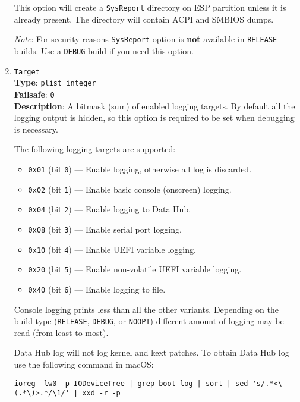 \documentclass[]{article}
\providecommand{\tightlist}{%
  \setlength{\itemsep}{0pt}\setlength{\parskip}{0pt}}
\begin{document}
\begin{enumerate}
  This option will create a \texttt{SysReport} directory on ESP partition
  unless it is already present. The directory will contain ACPI and SMBIOS dumps.

  \emph{Note}: For security reasons \texttt{SysReport} option is \textbf{not} available
  in \texttt{RELEASE} builds. Use a \texttt{DEBUG} build if you need this option.

\item
  \texttt{Target}\\
  \textbf{Type}: \texttt{plist\ integer}\\
  \textbf{Failsafe}: \texttt{0}\\
  \textbf{Description}: A bitmask (sum) of enabled logging targets.
  By default all the logging output is hidden, so this option is
  required to be set when debugging is necessary.

  The following logging targets are supported:

  \begin{itemize}
  \tightlist
    \item \texttt{0x01} (bit \texttt{0}) --- Enable logging, otherwise all log is discarded.
    \item \texttt{0x02} (bit \texttt{1}) --- Enable basic console (onscreen) logging.
    \item \texttt{0x04} (bit \texttt{2}) --- Enable logging to Data Hub.
    \item \texttt{0x08} (bit \texttt{3}) --- Enable serial port logging.
    \item \texttt{0x10} (bit \texttt{4}) --- Enable UEFI variable logging.
    \item \texttt{0x20} (bit \texttt{5}) --- Enable non-volatile UEFI variable logging.
    \item \texttt{0x40} (bit \texttt{6}) --- Enable logging to file.
  \end{itemize}

  Console logging prints less than all the other variants.
  Depending on the build type (\texttt{RELEASE}, \texttt{DEBUG}, or
  \texttt{NOOPT}) different amount of logging may be read (from least to most).

  Data Hub log will not log kernel and kext patches. To obtain Data Hub log use
  the following command in macOS:
\begin{lstlisting}[label=dhublog, style=ocbash]
ioreg -lw0 -p IODeviceTree | grep boot-log | sort | sed 's/.*<\(.*\)>.*/\1/' | xxd -r -p
\end{lstlisting}


\end{enumerate}
\end{document}
